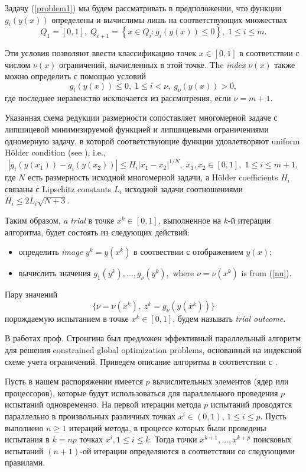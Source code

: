 \documentclass[
11pt,%
tightenlines,%
twoside,%
onecolumn,%
nofloats,%
nobibnotes,%
nofootinbib,%
superscriptaddress,%
noshowpacs,%
centertags]%
{revtex4}
\begin{document}
Задачу (\ref{problem1}) мы будем рассматривать в предположении, что функции $g_i(y(x))$ определены и вычислимы лишь на соответствующих множествах 
\[
Q_1=[0,1], \; Q_{i+1}=\left\{x \in Q_i : g_i(y(x)) \leq 0 \right\}, \; 1 \leq i \leq m.
\]

Эти условия позволяют ввести классификацию точек $x \in [0,1]$ в соответствии с числом $\nu (x)$ ограничений, вычисленных в этой точке. The \textit{index} $\nu(x)$ также можно определить с помощью условий
\begin{equation}\label{nu}
g_i(y(x)) \leq 0, \; 1 \leq i < \nu, \; g_\nu(y(x))>0,
\end{equation}
где последнее неравенство исключается из рассмотрения, если $\nu=m+1$.

Указанная схема редукции размерности сопоставляет многомерной задаче с липшицевой минимизируемой функцией и липшицевыми ограничениями одномерную задачу, в которой соответствующие функции удовлетворяют uniform H{\"o}lder condition (see \cite{Sergeyev2013}), i.e.,
\[
\left|g_i(y(x_1))-g_i (y(x_2))\right| \leq H_i \left|x_1-x_2 \right|^{1/N}, \; x_1,x_2\in [0,1], \; 
1\leq i \leq m+1,
\]
где $N$ есть размерность исходной многомерной задачи, а H{\"o}lder coefficients $H_i$ связаны с Lipschitz constants $L_i$ исходной задачи соотношениями $H_i \leq 2L_i \sqrt{N+3}$.

Таким образом, \textit{a trial} в точке $x^k \in [0,1]$, выполненное на $k$-й итерации алгоритма, будет состоять из следующих действий:
\begin{itemize}
	\item определить \textit{image} $y^k=y(x^k)$ в соотвествии с отображением $y(x)$;
	\item вычислить значения $g_1(y^k),..., g_\nu(y^k),$ where $\nu = \nu(x^k)$ is from (\ref{nu}). 
\end{itemize}
Пару значений 
\begin{equation} \label{trial_result}
 \{ \nu=\nu(x^k), \; z^k=g_\nu(y(x^k)) \} 
\end{equation}
порождаемую испытанием в точке $x^k \in [0,1]$, будем называть \textit{trial outcome}.

В работах проф. Стронгина был предложен эффективный параллельный алгоритм для решения constrained global optimization problems, основанный на индексной схеме учета ограничений. Приведем описание алгоритма в соответствии с \cite{Strongin2000,Strongin2013}.

Пусть в нашем распоряжении имеется $p$ вычислительных элементов (ядер или процессоров), которые будут использоваться для параллельного проведения $p$ испытаний одновременно. На первой итерации метода $p$ испытаний проводятся параллельно в произвольных различных точках $x^i\in(0,1)$, $1\leq i \leq p$.
Пусть выполнено $n\geq 1$  итераций метода, в процессе которых были проведены испытания в $k=np$ точках $x^i, 1\leq i \leq k$. Тогда точки $x^{k+1},...,x^{k+p}$  поисковых испытаний $(n+1)$-ой итерации определяются в соответствии со следующими правилами.
\end{document}
